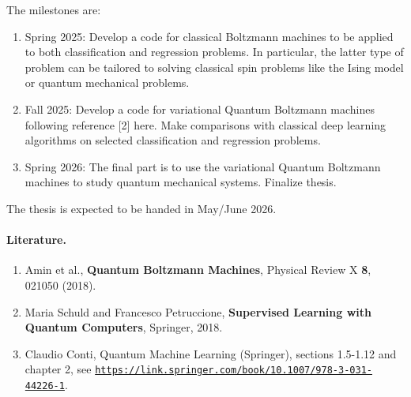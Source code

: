 \documentclass[%
oneside,                 %
final,                   %
10pt]{article}
\begin{document}
\noindent
The milestones are:
\begin{enumerate}
\item Spring 2025: Develop a code for classical Boltzmann machines to be applied to both classification and regression problems. In particular, the latter type of problem can be tailored to solving classical spin problems like the Ising model or quantum mechanical problems. 

\item Fall 2025: Develop a code for variational Quantum Boltzmann machines following reference [2] here.  Make comparisons with classical deep learning algorithms on selected classification and regression problems.

\item Spring 2026: The final part is to use the variational Quantum Boltzmann machines to study quantum mechanical systems. Finalize thesis. 
\end{enumerate}

\noindent
The thesis is expected to be handed in May/June 2026.

\paragraph{Literature.}
\begin{enumerate}
\item Amin et al., \textbf{Quantum Boltzmann Machines}, Physical Review X \textbf{8}, 021050 (2018).

\item Maria Schuld and Francesco Petruccione, \textbf{Supervised Learning with Quantum Computers}, Springer, 2018.

\item Claudio Conti, Quantum Machine Learning (Springer), sections 1.5-1.12 and chapter 2, see \href{{https://link.springer.com/book/10.1007/978-3-031-44226-1}}{\nolinkurl{https://link.springer.com/book/10.1007/978-3-031-44226-1}}.
\end{enumerate}

\noindent

\end{document}
